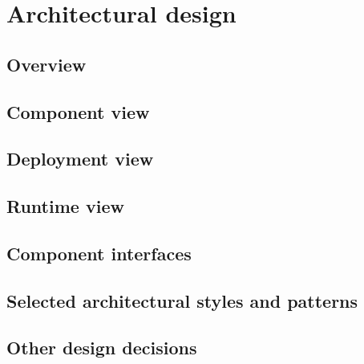 \chapter{Architectural design}

\section{Overview}
\section{Component view}
\section{Deployment view}
\section{Runtime view}
\section{Component interfaces}
\section{Selected architectural styles and patterns}
\section{Other design decisions}